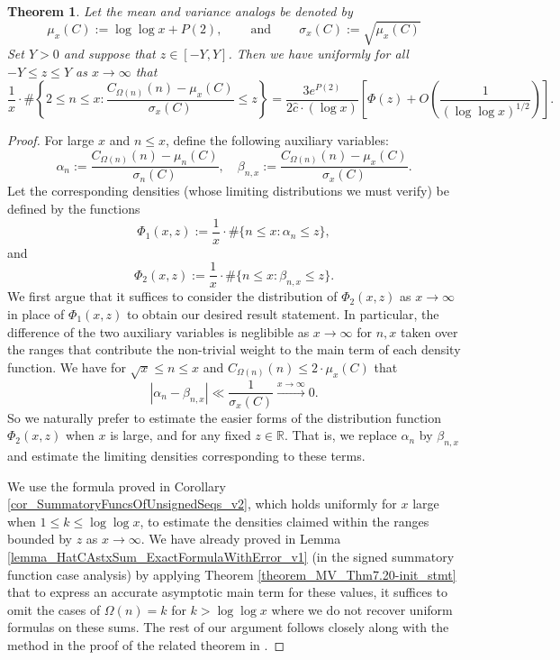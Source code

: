 \documentclass[11pt,reqno,a4letter]{article}
\numberwithin{figure}{section}
\numberwithin{table}{section}
\theoremstyle{plain}
\newtheorem{theorem}{Theorem}
\numberwithin{theorem}{section}
\theoremstyle{definition}
\begin{document}
\begin{theorem} 
\label{theorem_CLT_VI} 
Let the mean and variance analogs be denoted by 
\[
\mu_x(C) := \log\log x + P(2), 
     \qquad \mathrm{\ and\ } \qquad 
     \sigma_x(C) := \sqrt{\mu_x(C)}
\]
Set $Y > 0$ and suppose that $z \in [-Y, Y]$. Then we have 
uniformly for all $-Y \leq z \leq Y$ as $x \rightarrow \infty$ that 
\[
\frac{1}{x} \cdot \#\left\{2 \leq n \leq x: \frac{C_{\Omega(n)}(n) - 
     \mu_x(C)}{\sigma_x(C)} \leq z\right\} = 
     \frac{3 e^{P(2)}}{2\widehat{c} \cdot (\log x)} \left[\Phi(z) + 
     O\left(\frac{1}{(\log\log x)^{1/2}}\right)\right]. 
\] 
\end{theorem} 
\begin{proof} 
For large $x$ and $n \leq x$, define the following auxiliary variables: 
\[
\alpha_n := \frac{C_{\Omega(n)}(n) - \mu_n(C)}{\sigma_n(C)}, \quad 
     \beta_{n,x} := \frac{C_{\Omega(n)}(n) - \mu_x(C)}{\sigma_x(C)}. 
\] 
Let the corresponding densities (whose limiting distributions we must verify) 
be defined by the functions 
\[
\Phi_1(x, z) := \frac{1}{x} \cdot \#\{n \leq x: \alpha_n \leq z\}, 
\]
and 
\[
\Phi_2(x, z) := \frac{1}{x} \cdot \#\{n \leq x: \beta_{n,x} \leq z\}. 
\] 
We first argue that it suffices to consider the distribution of $\Phi_2(x, z)$ as 
$x \rightarrow \infty$ in place of $\Phi_1(x, z)$ to obtain our desired result statement. 
In particular, the difference of the two auxiliary variables is neglibible as 
$x \rightarrow \infty$ for $n,x$ taken over the ranges that contribute the non-trivial 
weight to the main term of each density function. We have for 
$\sqrt{x} \leq n \leq x$ and $C_{\Omega(n)}(n) \leq 2 \cdot \mu_x(C)$ that 
\[
|\alpha_n - \beta_{n,x}| \ll \frac{1}{\sigma_x(C)} \xrightarrow{x \rightarrow \infty} 0. 
\]
So we naturally prefer to estimate the easier forms of the distribution function $\Phi_2(x, z)$ 
when $x$ is large, and for any fixed $z \in \mathbb{R}$. 
That is, we replace $\alpha_n$ by $\beta_{n,x}$ and estimate the limiting 
densities corresponding to these terms. 

We use the formula proved in Corollary \ref{cor_SummatoryFuncsOfUnsignedSeqs_v2}, 
which holds uniformly for $x$ large when $1 \leq k \leq \log\log x$, to estimate the 
densities claimed within the ranges bounded by $z$ as $x \rightarrow \infty$. 
We have already proved in Lemma \ref{lemma_HatCAstxSum_ExactFormulaWithError_v1} 
(in the signed summatory function case analysis) by applying 
Theorem \ref{theorem_MV_Thm7.20-init_stmt} 
that to express an accurate asymptotic main term for these values, it 
suffices to omit the cases of $\Omega(n) = k$ for $k > \log\log x$ where we do not 
recover uniform formulas on these sums. The rest of our argument follows closely 
along with the method in the proof of the related theorem in 
\cite[Thm.\ 7.21; \S 7.4]{MV}. 


\end{proof}
\end{document}
